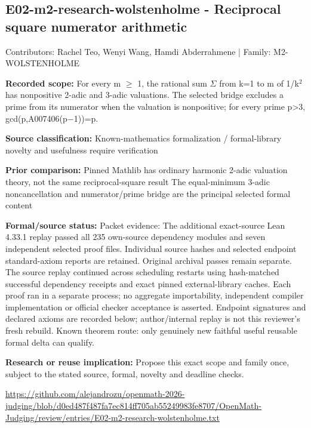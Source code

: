 \documentclass[11pt,a4paper]{article}
\begin{document}
\begin{samepage}
\subsection{E02-m2-research-wolstenholme  -  Reciprocal square numerator arithmetic}
{\small Contributors: Rachel Teo, Wenyi Wang, Hamdi Abderrahmene | Family: M2-WOLSTENHOLME\par}

\textbf{Recorded scope:} For every m \ensuremath{\geq} 1, the rational sum \ensuremath{\Sigma} from k=1 to m of 1/k\ensuremath{^2} has nonpositive 2-adic and 3-adic valuations. The selected bridge excludes a prime from its numerator when the valuation is nonpositive; for every prime p>3, gcd(p,A007406(p\ensuremath{-}1))=p.

\end{samepage}
\textbf{Source classification:} Known-mathematics formalization / formal-library novelty and usefulness require verification

\textbf{Prior comparison:} Pinned Mathlib has ordinary harmonic 2-adic valuation theory, not the same reciprocal-square result The equal-minimum 3-adic noncancellation and numerator/prime bridge are the principal selected formal content

\textbf{Formal/source status:} Packet evidence: The additional exact-source Lean 4.33.1 replay passed all 235 own-source dependency modules and seven independent selected proof files. Individual source hashes and selected endpoint standard-axiom reports are retained. Original archival passes remain separate. The source replay continued across scheduling restarts using hash-matched successful dependency receipts and exact pinned external-library caches. Each proof ran in a separate process; no aggregate importability, independent compiler implementation or official checker acceptance is asserted. Endpoint signatures and declared axioms are recorded below; author/internal replay is not this reviewer's fresh rebuild. Known theorem route: only genuinely new faithful useful reusable formal delta can qualify.

\textbf{Research or reuse implication:} Propose this exact scope and family once, subject to the stated source, formal, novelty and deadline checks.

{\small \url{https://github.com/alejandrozu/openmath-2026-judging/blob/d0ed487f487fa7ec814ff705ab55249983fe8707/OpenMath-Judging/review/entries/E02-m2-research-wolstenholme.txt}\par}
\end{document}
